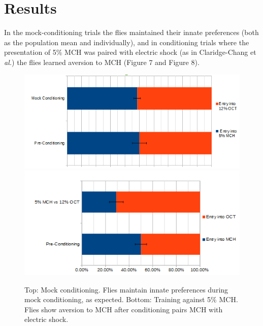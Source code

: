\documentclass{article}
\begin{document}

\section{Results}

In the mock-conditioning trials the flies maintained their innate preferences (both as the population mean and individually), and in conditioning trials where the presentation of 5\% MCH was paired with electric shock (as in Claridge-Chang et \textit{al.}) the flies learned aversion to MCH (Figure 7 and Figure 8).\\

\begin{figure}[h]
\begin{center}
\includegraphics[width=1\textwidth]{Figures/mock_conditioning}
\includegraphics[width=1\textwidth]{Figures/5MCH_vs_OCT_conditioning}
\caption{Top: Mock conditioning. Flies maintain innate preferences during mock conditioning, as expected. Bottom: Training against 5\% MCH. Flies show aversion to MCH after conditioning pairs MCH with electric shock.}
\end{center}
\end{figure}
\end{document}

